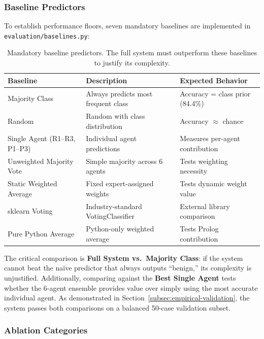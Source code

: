 \documentclass[12pt]{article}
\begin{document}
\subsubsection{Baseline Predictors}

To establish performance floors, seven mandatory baselines are implemented in \texttt{evaluation/baselines.py}:

\begin{table}[ht]
\centering
\small
\begin{tabular}{lll}
\toprule
\textbf{Baseline} & \textbf{Description} & \textbf{Expected Behavior} \\
\midrule
Majority Class & Always predicts most frequent class & Accuracy = class prior (84.4\%) \\
Random & Random with class distribution & Accuracy $\approx$ chance \\
Single Agent (R1--R3, P1--P3) & Individual agent predictions & Measures per-agent contribution \\
Unweighted Majority Vote & Simple majority across 6 agents & Tests weighting necessity \\
Static Weighted Average & Fixed expert-assigned weights & Tests dynamic weight value \\
sklearn Voting & Industry-standard VotingClassifier & External library comparison \\
Pure Python Average & Python-only weighted average & Tests Prolog contribution \\
\bottomrule
\end{tabular}
\caption{Mandatory baseline predictors. The full system must outperform these baselines to justify its complexity.}
\label{tab:baselines}
\end{table}

The critical comparison is \textbf{Full System vs.\ Majority Class}: if the system cannot beat the na\"ive predictor that always outputs ``benign,'' its complexity is unjustified. Additionally, comparing against the \textbf{Best Single Agent} tests whether the 6-agent ensemble provides value over simply using the most accurate individual agent. As demonstrated in Section~\ref{subsec:empirical-validation}, the system passes both comparisons on a balanced 50-case validation subset.

\subsubsection{Ablation Categories}
\end{document}
